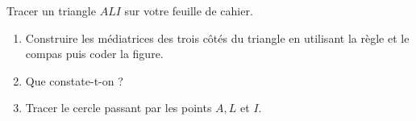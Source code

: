 \begin{exercice*}
   Tracer un triangle $ALI$ sur votre feuille de cahier.
   \begin{enumerate}
      \item Construire les médiatrices des trois côtés du triangle en utilisant la règle et le compas puis coder la figure.
      \item Que constate-t-on ?
      \item Tracer le cercle passant par les points $A, L$ et $I$.
   \end{enumerate}
\end{exercice*}


